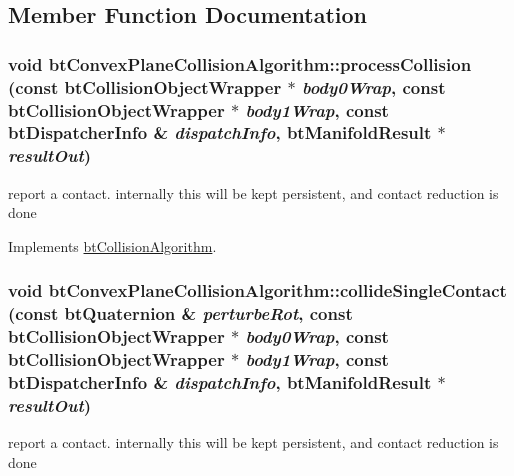 \subsection{Member Function Documentation}
\hypertarget{classbt_convex_plane_collision_algorithm_ce95b966a346d00f7666549220f6afb8}{
\subsubsection[processCollision]{\setlength{\rightskip}{0pt plus 5cm}void btConvexPlaneCollisionAlgorithm::processCollision (const btCollisionObjectWrapper $\ast$ {\em body0Wrap}, \/  const btCollisionObjectWrapper $\ast$ {\em body1Wrap}, \/  const btDispatcherInfo \& {\em dispatchInfo}, \/  {\bf btManifoldResult} $\ast$ {\em resultOut})}}
\label{classbt_convex_plane_collision_algorithm_ce95b966a346d00f7666549220f6afb8}




report a contact. internally this will be kept persistent, and contact reduction is done 

Implements \hyperlink{classbt_collision_algorithm}{btCollisionAlgorithm}.\hypertarget{classbt_convex_plane_collision_algorithm_79f8384fcdc2145be9fca0057edc8b69}{
\subsubsection[collideSingleContact]{\setlength{\rightskip}{0pt plus 5cm}void btConvexPlaneCollisionAlgorithm::collideSingleContact (const {\bf btQuaternion} \& {\em perturbeRot}, \/  const btCollisionObjectWrapper $\ast$ {\em body0Wrap}, \/  const btCollisionObjectWrapper $\ast$ {\em body1Wrap}, \/  const btDispatcherInfo \& {\em dispatchInfo}, \/  {\bf btManifoldResult} $\ast$ {\em resultOut})}}
\label{classbt_convex_plane_collision_algorithm_79f8384fcdc2145be9fca0057edc8b69}




report a contact. internally this will be kept persistent, and contact reduction is done 

